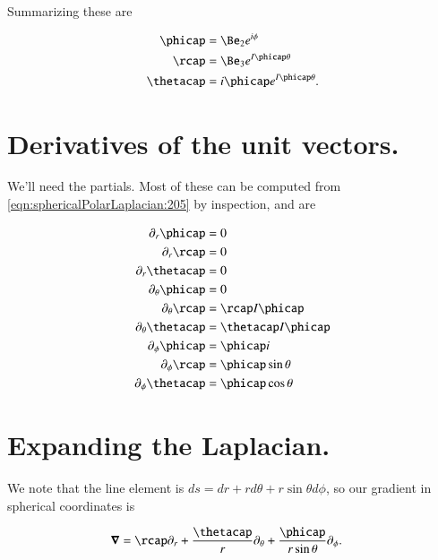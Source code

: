 Summarizing these are

\begin{subequations}
\label{eqn:sphericalPolarLaplacian:205}
\begin{align}
\phicap &= \Be_2 e^{ i \phi } \\
\rcap &= \Be_3 e^{I \phicap \theta} \\
\thetacap &= i \phicap e^{I \phicap \theta}.
\end{align}
\end{subequations}

\section{Derivatives of the unit vectors.}

We'll need the partials.  Most of these can be computed from \ref{eqn:sphericalPolarLaplacian:205} by inspection, and are

\begin{subequations}
\label{eqn:sphericalPolarLaplacian:206}
\begin{align}
\partial_r \phicap &= 0 \\
\partial_r \rcap &= 0 \\
\partial_r \thetacap &= 0 \\
\partial_\theta \phicap &= 0 \\
\partial_\theta \rcap &= \rcap I \phicap \\
\partial_\theta \thetacap &= \thetacap I \phicap \\
\partial_\phi \phicap &= \phicap i \\
\partial_\phi \rcap &= \phicap \sin\theta \\
\partial_\phi \thetacap &= \phicap \cos\theta
\end{align}
\end{subequations}

\section{Expanding the Laplacian.}

We note that the line element is $ds = dr + r d\theta + r\sin\theta d\phi$, so our gradient in spherical coordinates is

\begin{align}\label{eqn:sphericalPolarLaplacian:300}
\spacegrad &= \rcap \partial_r + \frac{\thetacap}{r} \partial_\theta + \frac{\phicap}{r\sin\theta} \partial_\phi.
\end{align}

